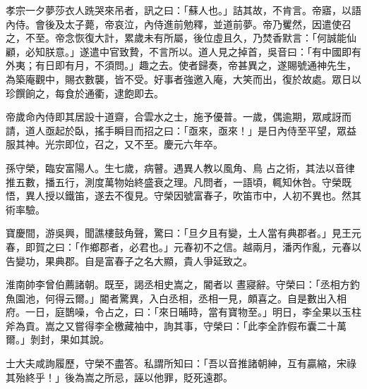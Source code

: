 \begin{pinyinscope}
 孝宗一夕夢莎衣人跣哭來吊者，訊之曰：「蘇人也。」詰其故，不肯言。帝寤，以語內侍。會後及太子薨，帝哀泣，內侍進前勉釋，並道前夢。帝乃矍然，因遣使召之，不至。帝念恢復大計，累歲未有所屬，後位虛且久，乃焚香默言：「何誠能仙顧，必知朕意。」遂遣中官致贄，不言所以。道人見之掉首，吳音曰：「有中國即有
 外夷；有日即有月，不須問。」趣之去。使者歸奏，帝甚異之，遂賜號通神先生，為築庵觀中，賜衣數襲，皆不受。好事者強邀入庵，大笑而出，復於故處。眾日以珍饌餉之，每食於通衢，逮飽即去。



 帝歲命內侍即其居設十道齋，合雲水之士，施予優普。一歲，偶逾期，眾咸訝而請，道人亟起於臥，搖手瞬目而招之曰：「亟來，亟來！」是日內侍至平望，眾益服其神。光宗即位，召之，又不至。慶元六年卒。



 孫守榮，臨安富陽人。生七歲，病瞽。遇異人教以風角、鳥
 占之術，其法以音律推五數，播五行，測度萬物始終盛衰之理。凡問者，一語頃，輒知休咎。守榮既悟，異人授以鐵笛，遂去不復見。守榮因號富春子，吹笛市中，人初不異也。然其術率驗。



 寶慶間，游吳興，聞譙樓鼓角聲，驚曰：「旦夕且有變，土人當有典郡者。」見王元春，即賀之曰：「作鄉郡者，必君也。」元春初不之信。越兩月，潘丙作亂，元春以告變功，果典郡。自是富春子之名大顯，貴人爭延致之。



 淮南帥李曾伯薦諸朝。既至，謁丞相史嵩之，閽者以
 晝寢辭。守榮曰：「丞相方釣魚園池，何得云爾。」閽者驚異，入白丞相，丞相一見，頗喜之。自是數出入相府。一日，庭鵲噪，令占之，曰：「來日晡時，當有寶物至。」明日，李全果以玉柱斧為貢。嵩之又嘗得李全檄藏袖中，詢其事，守榮曰：「此李全詐假布囊二十萬爾。」剝封，果如其說。



 士大夫咸詢履歷，守榮不盡答。私謂所知曰：「吾以音推諸朝紳，互有贏縮，宋祿其殆終乎！」後為嵩之所忌，誣以他罪，貶死遠郡。



\end{pinyinscope}